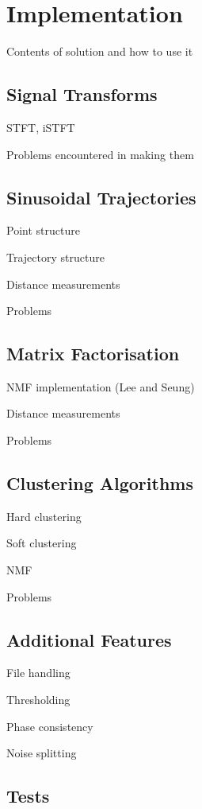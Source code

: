 \documentclass[10pt,twoside,a4paper]{report}
\begin{document}
\chapter{Implementation}

Contents of solution and how to use it

\section{Signal Transforms}

STFT, iSTFT

Problems encountered in making them

\section{Sinusoidal Trajectories}

Point structure

Trajectory structure

Distance measurements

Problems

\section{Matrix Factorisation}

NMF implementation (Lee and Seung)

Distance measurements

Problems

\section{Clustering Algorithms}

Hard clustering

Soft clustering

NMF

Problems

\section{Additional Features}

File handling

Thresholding

Phase consistency

Noise splitting

\section{Tests}
\end{document}
